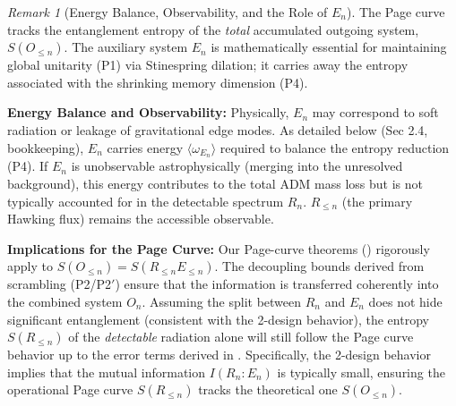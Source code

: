 \documentclass[a4paper,11pt]{article}
\theoremstyle{plain}
\theoremstyle{definition}
\theoremstyle{remark}
\newtheorem{remark}{Remark}
\begin{document}
\begin{remark}[Energy Balance, Observability, and the Role of $E_n$]\label{rem:entropy_target_E_n}
The Page curve tracks the entanglement entropy of the \emph{total} accumulated outgoing system, $S(O_{\le n})$. The auxiliary system $E_n$ is mathematically essential for maintaining global unitarity (P1) via Stinespring dilation; it carries away the entropy associated with the shrinking memory dimension (P4).

\textbf{Energy Balance and Observability:} Physically, $E_n$ may correspond to soft radiation or leakage of gravitational edge modes. As detailed below (Sec 2.4, bookkeeping), $E_n$ carries energy $\langle \omega_{E_{n}}\rangle$ required to balance the entropy reduction (P4). If $E_n$ is unobservable astrophysically (merging into the unresolved background), this energy contributes to the total ADM mass loss but is not typically accounted for in the detectable spectrum $R_n$. $R_{\le n}$ (the primary Hawking flux) remains the accessible observable.

\textbf{Implications for the Page Curve:} Our Page-curve theorems () rigorously apply to $S(O_{\le n})=S(R_{\le n}E_{\le n})$. The decoupling bounds derived from scrambling (P2/P2$'$) ensure that the information is transferred coherently into the combined system $O_n$. Assuming the split between $R_n$ and $E_n$ does not hide significant entanglement (consistent with the 2-design behavior), the entropy $S(R_{\le n})$ of the \emph{detectable} radiation alone will still follow the Page curve behavior up to the error terms derived in .
Specifically, the 2-design behavior implies that the mutual information $I(R_n:E_n)$ is typically small, ensuring the operational Page curve $S(R_{\le n})$ tracks the theoretical one $S(O_{\le n})$.
\end{remark}
\end{document}

